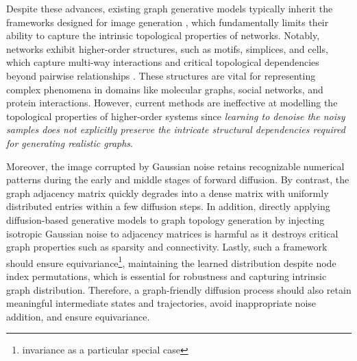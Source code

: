 Despite these advances, existing graph generative models typically inherit the frameworks designed for image generation \cite{Score-SDE+ICLR2021}, which fundamentally limits their ability to capture the intrinsic topological properties of networks. 
%
Notably, networks exhibit higher-order structures, such as motifs, simplices, and cells, which capture multi-way interactions and critical topological dependencies beyond pairwise relationships \cite{HigherOrderReview2020,ISMnet2024,TDL-position+ICML2024}.
These structures are vital for representing complex phenomena in domains like molecular graphs, social networks, and protein interactions.
However, current methods are ineffective at modelling the topological properties of higher-order systems since \emph{learning to denoise the noisy samples does not explicitly preserve the intricate structural dependencies required for generating realistic graphs}.


% 
Moreover, the image corrupted by Gaussian noise retains recognizable numerical patterns during the early and middle stages of forward diffusion. By contrast, the graph adjacency matrix quickly degrades into a dense matrix with uniformly distributed entries within a few diffusion steps. 
%
In addition, directly applying diffusion-based generative models to graph topology generation by injecting isotropic Gaussian noise to adjacency matrices is harmful as it destroys critical graph properties such as sparsity and connectivity.
%
%
Lastly, such a framework should ensure equivariance\footnote{invariance as a particular special case}, maintaining the learned distribution despite node index permutations, which is essential for robustness and capturing intrinsic graph distribution.
%
%
Therefore, a graph-friendly diffusion process should also retain meaningful intermediate states and trajectories, avoid inappropriate noise addition, and ensure equivariance.




